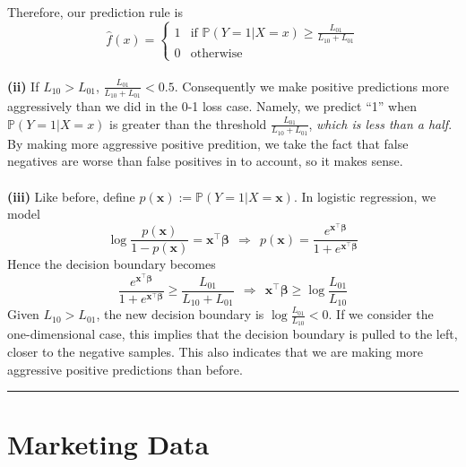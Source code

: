 \documentclass[11pt]{article}
\begin{document}
Therefore, our prediction rule is
\begin{equation}
    \hat{f}(x) = \begin{cases}
    1 & \text{if } \mathbb{P}\left(Y=1|X=x\right)\geq \frac{L_{01}}{L_{10}+L_{01}}\\
    0 & \text{otherwise}
    \end{cases}
\end{equation}
~\\
\textbf{(ii)} If $L_{10} > L_{01}$, $\frac{L_{01}}{L_{10}+L_{01}} < 0.5$. Consequently we make positive predictions more aggressively than we did in the 0-1 loss case. Namely, we predict ``1'' when $ \mathbb{P}\left(Y=1|X=x\right)$ is greater than the threshold $\frac{L_{01}}{L_{10}+L_{01}}$, \textit{which is less than a half}. By making more aggressive positive predition, we take the fact that false negatives are worse than false positives in to account, so it makes sense.\\
~\\
\textbf{(iii)} Like before, define $p(\bm{x}):=\mathbb{P}\left(Y=1|X=\bm{x}\right)$. In logistic regression, we model
\begin{equation}
    \log \frac{p(\bm{x})}{1-p(\bm{x})} = \bm{\bm{x}^{\top} \beta}~~\Rightarrow~~p(\bm{x}) = \frac{e^{\bm{\bm{x}^{\top}\bm{\beta}}}}{1+e^{\bm{x}^{\top}\bm{\beta}}}
\end{equation}
Hence the decision boundary becomes
\begin{equation}
    \frac{e^{\bm{\bm{x}^{\top}\bm{\beta}}}}{1+e^{\bm{x}^{\top}\bm{\beta}}}\geq \frac{L_{01}}{L_{10}+L_{01}} ~~\Rightarrow ~~\bm{x}^{\top}\bm{\beta} \geq \log\frac{L_{01}}{L_{10}}
\end{equation}
Given $L_{10} > L_{01}$, the new decision boundary is $\log\frac{L_{01}}{L_{10}} < 0$. If we consider the one-dimensional case, this implies that the decision boundary is pulled to the left, closer to the negative samples. This also indicates that we are making more aggressive positive predictions than before.

    
    \noindent\rule{16cm}{0.4pt}
    
    \section{Marketing Data}\label{marketing-data}
\end{document}
